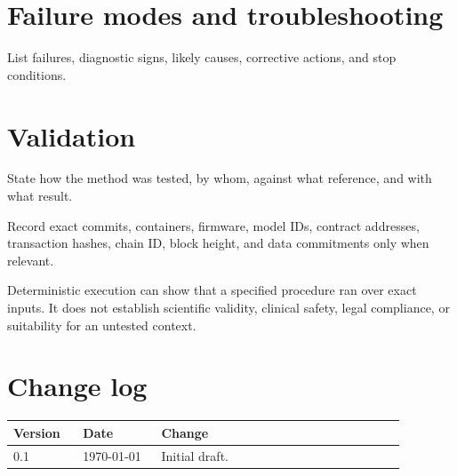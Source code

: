 \documentclass[11pt,a4paper]{article}
\begin{document}
\section{Failure modes and troubleshooting}
List failures, diagnostic signs, likely causes, corrective actions, and stop conditions.
\section{Validation}
State how the method was tested, by whom, against what reference, and with what result.
\begin{GenesisProvenance}
Record exact commits, containers, firmware, model IDs, contract addresses, transaction
hashes, chain ID, block height, and data commitments only when relevant.
\end{GenesisProvenance}
\begin{GenesisTrustBoundary}
Deterministic execution can show that a specified procedure ran over exact inputs. It does
not establish scientific validity, clinical safety, legal compliance, or suitability for an
untested context.
\end{GenesisTrustBoundary}
\section{Change log}
\begin{longtable}{p{0.16\linewidth}p{0.18\linewidth}p{0.56\linewidth}}
\toprule Version & Date & Change \\ \midrule
0.1 & \today & Initial draft. \\ \bottomrule
\end{longtable}
\end{document}
